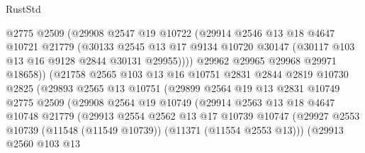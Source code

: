 \begin{lexlean}{RustStd}
\begin{coremodule}
                        @2775
                        @2509
                        (@29908
                          @2547
                          @19
                          @10722
                          (@29914
                            @2546
                            @13
                            @18
                            @4647
                            @10721
                            @21779
                            (@30133
                              @2545
                              @13
                              @17
                              @9134
                              @10720
                              @30147
                              (@30117 @103 @13 @16 @9128 @2844 @30131 @29955))))
                        @29962
                        @29965
                        @29968
                        @29971
                        @18658))
                    (@21758
                      @2565
                      @103
                      @13
                      @16
                      @10751
                      @2831
                      @2844
                      @2819
                      @10730
                      @2825
                      (@29893
                        @2565
                        @13
                        @10751
                        (@29899
                          @2564
                          @19
                          @13
                          @2831
                          @10749
                          @2775
                          @2509
                          (@29908
                            @2564
                            @19
                            @10749
                            (@29914
                              @2563
                              @13
                              @18
                              @4647
                              @10748
                              @21779
                              (@29913
                                @2554
                                @2562
                                @13
                                @17
                                @10739
                                @10747
                                (@29927
                                  @2553
                                  @10739
                                  (@11548 (@11549 @10739))
                                  (@11371 (@11554 @2553 @13)))
                                (@29913
                                  @2560
                                  @103
                                  @13

\end{coremodule}
\end{lexlean}
